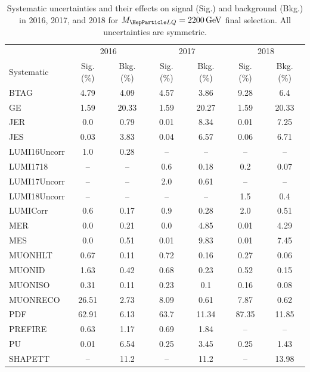 \begin{table}[H]
	\begin{center}
        \begin{footnotesize}
			\caption{Systematic uncertainties and their effects on signal (Sig.) and background (Bkg.) in 2016, 2017, and 2018 for $\MLQ = \SI{2200}{GeV}$ final selection. All uncertainties are symmetric.}
			\begin{tabular}{lcccccc} \hline \hline
				& \multicolumn{2}{c}{2016} & \multicolumn{2}{c}{2017} & \multicolumn{2}{c}{2018} \\
				Systematic & Sig. (\%) & Bkg. (\%) & Sig. (\%) & Bkg. (\%) & Sig. (\%) & Bkg. (\%) \\ \hline
				BTAG &  4.79  &  4.09 &  4.57  &  3.86 &  9.28  &  6.4 \\
				GE &  1.59  &  20.33 &  1.59  &  20.27 &  1.59  &  20.33 \\
				JER &  0.0  &  0.79 &  0.01  &  8.34 &  0.01  &  7.25 \\
				JES &  0.03  &  3.83 &  0.04  &  6.57 &  0.06  &  6.71 \\
				LUMI16Uncorr &  1.0  &  0.28 & -- & -- & -- & -- \\
				LUMI1718 & -- & -- &  0.6  &  0.18 &  0.2  &  0.07 \\
				LUMI17Uncorr & -- & -- &  2.0  &  0.61 & -- & -- \\
				LUMI18Uncorr & -- & -- & -- & -- &  1.5  &  0.4 \\
				LUMICorr &  0.6  &  0.17 &  0.9  &  0.28 &  2.0  &  0.51 \\
				MER &  0.0  &  0.21 &  0.0  &  4.85 &  0.01  &  4.29 \\
				MES &  0.0  &  0.51 &  0.01  &  9.83 &  0.01  &  7.45 \\
				MUONHLT &  0.67  &  0.11 &  0.72  &  0.16 &  0.27  &  0.06 \\
				MUONID &  1.63  &  0.42 &  0.68  &  0.23 &  0.52  &  0.15 \\
				MUONISO &  0.31  &  0.11 &  0.23  &  0.1 &  0.16  &  0.08 \\
				MUONRECO &  26.51  &  2.73 &  8.09  &  0.61 &  7.87  &  0.62 \\
				PDF &  62.91  &  6.13 &  63.7  &  11.34 &  87.35  &  11.85 \\
				PREFIRE &  0.63  &  1.17 &  0.69  &  1.84 & -- & -- \\
				PU &  0.01  &  6.54 &  0.25  &  3.45 &  0.25  &  1.43 \\
				SHAPETT & -- &  11.2 & -- &  11.2 & -- &  13.98 \\

\end{tabular}
\end{footnotesize}
\end{center}
\end{table}
